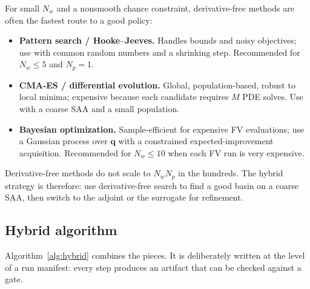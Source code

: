 \documentclass[11pt]{article}
\numberwithin{equation}{section}
\theoremstyle{plain}
\begin{document}
For small $N_w$ and a nonsmooth chance constraint, derivative-free methods are
often the fastest route to a good policy:
\begin{itemize}[leftmargin=1.6em,itemsep=2pt]
  \item \textbf{Pattern search / Hooke--Jeeves.}  Handles bounds and noisy
        objectives; use with common random numbers and a shrinking step.
        Recommended for $N_w\le5$ and $N_p=1$.
  \item \textbf{CMA-ES / differential evolution.}  Global, population-based,
        robust to local minima; expensive because each candidate requires $M$
        PDE solves.  Use with a coarse SAA and a small population.
  \item \textbf{Bayesian optimization.}  Sample-efficient for expensive FV
        evaluations; use a Gaussian process over $\mathbf{q}$ with a
        constrained expected-improvement acquisition.  Recommended for
        $N_w\le10$ when each FV run is very expensive.
\end{itemize}
Derivative-free methods do not scale to $N_wN_p$ in the hundreds.  The hybrid
strategy is therefore: use derivative-free search to find a good basin on a
coarse SAA, then switch to the adjoint or the surrogate for refinement.

\subsection{Hybrid algorithm}

Algorithm~\ref{alg:hybrid} combines the pieces.  It is deliberately written
at the level of a run manifest: every step produces an artifact that can be
checked against a gate.
\end{document}
